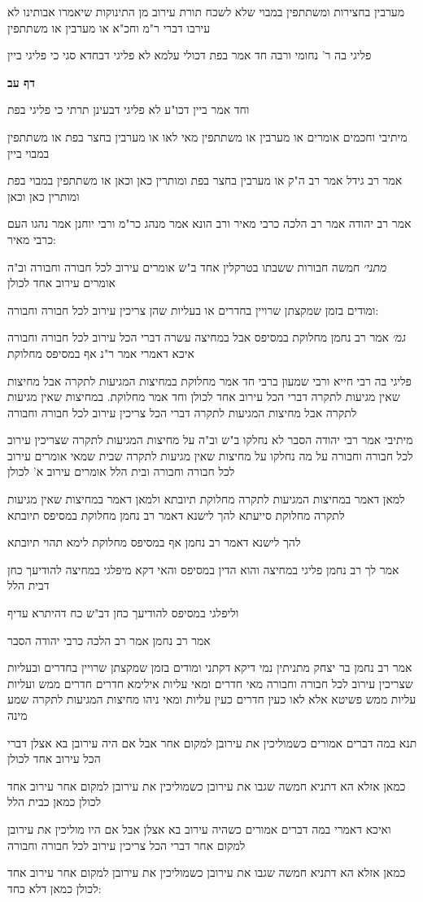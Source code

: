 \documentclass[12pt, openany]{book}
\newcommand{\sethebfont}{
\fontsize{10.5pt}{21.0pt} \selectfont
}
\newcommand{\textblock}[1]{
{\sethebfont #1\\}	
}
\newcommand{\sectname}{}
\newcommand{\newsection}[1]{
	\addcontentsline{toc}{section}{#1}
	\renewcommand{\sectname}{#1}	
	\vspace{-\baselineskip}
	\begin{center}
		\textbf{%
\fontsize{16pt}{16pt}\selectfont
			#1}
	\end{center}
	\vspace{-\baselineskip}
	\nopagebreak
}
\begin{document}
\textblock{מערבין בחצירות ומשתתפין במבוי שלא לשכח תורת עירוב מן התינוקות שיאמרו אבותינו לא עירבו דברי ר"מ וחכ"א או מערבין או משתתפין}
\textblock{פליגי בה ר' נחומי ורבה חד אמר בפת דכולי עלמא לא פליגי דבחדא סגי כי פליגי ביין}
\newsection{דף עב}
\textblock{וחד אמר ביין דכו"ע לא פליגי דבעינן תרתי כי פליגי בפת}
\textblock{מיתיבי וחכמים אומרים או מערבין או משתתפין מאי לאו או מערבין בחצר בפת או משתתפין במבוי ביין}
\textblock{אמר רב גידל אמר רב ה"ק או מערבין בחצר בפת ומותרין כאן וכאן או משתתפין במבוי בפת ומותרין כאן וכאן}
\textblock{אמר רב יהודה אמר רב הלכה כרבי מאיר ורב הונא אמר מנהג כר"מ ורבי יוחנן אמר נהגו העם כרבי מאיר:}
\textblock{{\large\emph{מתני׳}} חמשה חבורות ששבתו בטרקלין אחד ב"ש אומרים עירוב לכל חבורה וחבורה וב"ה אומרים עירוב אחד לכולן}
\textblock{ומודים בזמן שמקצתן שרויין בחדרים או בעליות שהן צריכין עירוב לכל חבורה וחבורה:}
\textblock{{\large\emph{גמ׳}} אמר רב נחמן מחלוקת במסיפס אבל במחיצה עשרה דברי הכל עירוב לכל חבורה וחבורה איכא דאמרי אמר ר"נ אף במסיפס מחלוקת}
\textblock{פליגי בה רבי חייא ורבי שמעון ברבי חד אמר מחלוקת במחיצות המגיעות לתקרה אבל מחיצות שאין מגיעות לתקרה דברי הכל עירוב אחד לכולן וחד אמר מחלוקת. במחיצות שאין מגיעות לתקרה אבל מחיצות המגיעות לתקרה דברי הכל צריכין עירוב לכל חבורה וחבורה}
\textblock{מיתיבי אמר רבי יהודה הסבר לא נחלקו ב"ש וב"ה על מחיצות המגיעות לתקרה שצריכין עירוב לכל חבורה וחבורה על מה נחלקו על מחיצות שאין מגיעות לתקרה שבית שמאי אומרים עירוב לכל חבורה וחבורה ובית הלל אומרים עירוב א' לכולן}
\textblock{למאן דאמר במחיצות המגיעות לתקרה מחלוקת תיובתא ולמאן דאמר במחיצות שאין מגיעות לתקרה מחלוקת סייעתא להך לישנא דאמר רב נחמן מחלוקת במסיפס תיובתא}
\textblock{להך לישנא דאמר רב נחמן אף במסיפס מחלוקת לימא תהוי תיובתא}
\textblock{אמר לך רב נחמן פליגי במחיצה והוא הדין במסיפס והאי דקא מיפלגי במחיצה להודיעך כחן דבית הלל}
\textblock{וליפלגי במסיפס להודיעך כחן דב"ש כח דהיתרא עדיף}
\textblock{אמר רב נחמן אמר רב הלכה כרבי יהודה הסבר}
\textblock{אמר רב נחמן בר יצחק מתניתין נמי דיקא דקתני ומודים בזמן שמקצתן שרויין בחדרים ובעליות שצריכין עירוב לכל חבורה וחבורה מאי חדרים ומאי עליות אילימא חדרים חדרים ממש ועליות עליות ממש פשיטא אלא לאו כעין חדרים כעין עליות ומאי ניהו מחיצות המגיעות לתקרה שמע מינה}
\textblock{תנא במה דברים אמורים כשמוליכין את עירובן למקום אחר אבל אם היה עירובן בא אצלן דברי הכל עירוב אחד לכולן}
\textblock{כמאן אזלא הא דתניא חמשה שגבו את עירובן כשמוליכין את עירובן למקום אחר עירוב אחד לכולן כמאן כבית הלל}
\textblock{ואיכא דאמרי במה דברים אמורים כשהיה עירוב בא אצלן אבל אם היו מוליכין את עירובן למקום אחר דברי הכל צריכין עירוב לכל חבורה וחבורה}
\textblock{כמאן אזלא הא דתניא חמשה שגבו את עירובן כשמוליכין את עירובן למקום אחר עירוב אחד לכולן כמאן דלא כחד:}
\end{document}
